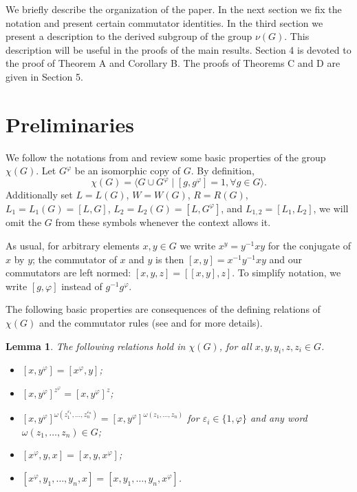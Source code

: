 \documentclass[12pt,leqno]{amsart}
\newtheorem{lem}[theorem]{\sc Lemma}
\begin{document}
We briefly describe the organization of the paper. In the next section we fix the notation and present certain commutator identities. In the third section we present a description to the derived subgroup of the group $\nu(G)$. This description will be useful in the proofs of the main results. Section 4 is devoted to the proof of Theorem A and Corollary B. The proofs of Theorems C and D are given in Section 5.  

\section{Preliminaries}

We follow the notations from \cite{Sidki} and review some basic properties of
the group $\chi(G)$. Let $G^{\varphi}$ be an isomorphic copy of $G$. By definition, 
\[
\chi(G) = \langle G \cup G^\varphi \mid  [g,g^\varphi]=1,\forall g \in G \rangle.
\]
Additionally set 
$L=L(G)$, $W=W(G)$, $R=R(G)$, $L_1=L_1(G)=[L,G]$, $L_2=L_2(G)=[L,G^\varphi]$, and $L_{1,2} = [L_1,L_2]$, we will omit the $G$ from these symbols whenever the
context allows it. 

As usual, for arbitrary elements $x,y \in G$ we write $x^y=y^{-1}xy$ for the conjugate of $x$ by $y$; the commutator of $x$ and $y$ is then $[x,y] = x^{-1}y^{-1}xy$ and our commutators are left normed: $[x,y,z] = [[x,y],z]$. To simplify notation, we write $[g,\varphi]$ instead of $g^{-1}g^{\varphi}$. 

The following basic properties are consequences of 
the defining relations of $\chi(G)$ and the commutator rules (see \cite[Proposition 4.1.13]{Sidki} and \cite[Lemma 2.1]{Roc82} for more details). 

\begin{lem} 
\label{basic.chi}
The following relations hold in $\chi(G)$, for all 
$x, y,y_i,z,z_i \in G$.
\begin{itemize}
\item[(i)] $[x,y^{\varphi}] = [x^{\varphi},y]$;
\item[(ii)] $[x,y^{\varphi}]^{z^{\varphi}} = [x,y^{\varphi}]^z$;
\item[(iii)] $[x,y^{\varphi}]^{\omega(z_1^{\varepsilon_1},\ldots,z_n^{\varepsilon_n})} = [x,y^{\varphi}]^{\omega(z_1,\ldots,z_n)}$ for $\varepsilon_i \in \{1,\varphi\}$ and any word $\omega(z_1,\ldots,z_n) \in G$; 
\item[(iv)] $[x^{\varphi},y,x]=[x,y,x^{\varphi}]$;
\item[(v)] $[x^{\varphi},y_1,\ldots,y_n,x] = [x,y_1,\ldots,y_n,x^{\varphi}]$.
\end{itemize}
\end{lem}
\end{document}
